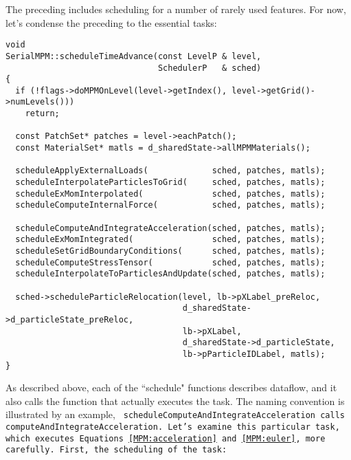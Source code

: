 The preceding includes scheduling for a number of rarely used features.
For now, let's condense the preceding to the essential tasks:

\begin{Verbatim}[fontsize=\footnotesize]
void
SerialMPM::scheduleTimeAdvance(const LevelP & level,
                               SchedulerP   & sched)
{
  if (!flags->doMPMOnLevel(level->getIndex(), level->getGrid()->numLevels()))
    return;

  const PatchSet* patches = level->eachPatch();
  const MaterialSet* matls = d_sharedState->allMPMMaterials();

  scheduleApplyExternalLoads(             sched, patches, matls);
  scheduleInterpolateParticlesToGrid(     sched, patches, matls);
  scheduleExMomInterpolated(              sched, patches, matls);
  scheduleComputeInternalForce(           sched, patches, matls);

  scheduleComputeAndIntegrateAcceleration(sched, patches, matls);
  scheduleExMomIntegrated(                sched, patches, matls);
  scheduleSetGridBoundaryConditions(      sched, patches, matls);
  scheduleComputeStressTensor(            sched, patches, matls);
  scheduleInterpolateToParticlesAndUpdate(sched, patches, matls);

  sched->scheduleParticleRelocation(level, lb->pXLabel_preReloc,
                                    d_sharedState->d_particleState_preReloc,
                                    lb->pXLabel,
                                    d_sharedState->d_particleState,
                                    lb->pParticleIDLabel, matls);
}
\end{Verbatim}

As described above, each of the ``schedule" functions describes
dataflow, and it also calls the function that actually executes the
task.  The naming convention is illustrated by an example, \tt
scheduleComputeAndIntegrateAcceleration \normalfont calls \tt
computeAndIntegrateAcceleration. \normalfont Let's examine this
particular task, which executes Equations~\ref{MPM:acceleration}
and~\ref{MPM:euler}, more carefully.  First, the scheduling of the
task:


